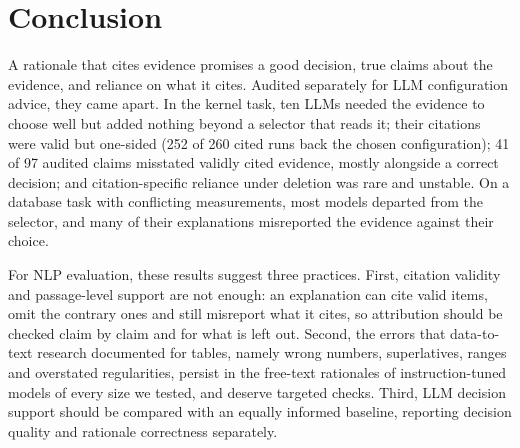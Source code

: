 \section{Conclusion}
\label{sec:conclusion}
A rationale that cites evidence promises a good decision, true claims about the evidence, and reliance on what it cites. Audited separately for LLM configuration advice, they came apart. In the kernel task, ten LLMs needed the evidence to choose well but added nothing beyond a selector that reads it; their citations were valid but one-sided (252 of 260 cited runs back the chosen configuration); 41 of 97 audited claims misstated validly cited evidence, mostly alongside a correct decision; and citation-specific reliance under deletion was rare and unstable. On a database task with conflicting measurements, most models departed from the selector, and many of their explanations misreported the evidence against their choice.

For NLP evaluation, these results suggest three practices. First, citation validity and passage-level support are not enough: an explanation can cite valid items, omit the contrary ones and still misreport what it cites, so attribution should be checked claim by claim and for what is left out. Second, the errors that data-to-text research documented for tables, namely wrong numbers, superlatives, ranges and overstated regularities, persist in the free-text rationales of instruction-tuned models of every size we tested, and deserve targeted checks. Third, LLM decision support should be compared with an equally informed baseline, reporting decision quality and rationale correctness separately.
